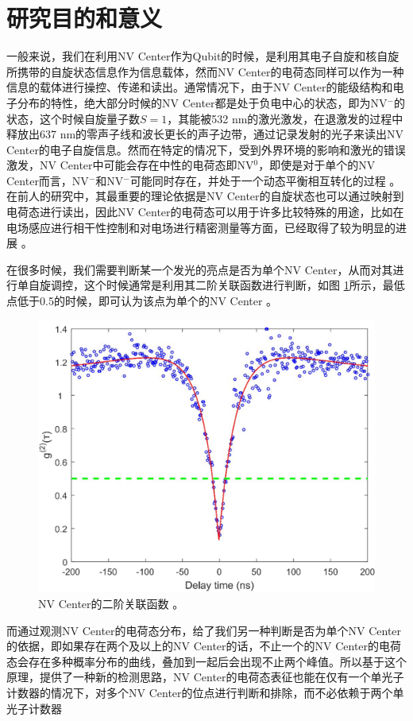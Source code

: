 \documentclass[type = bachelor, oneside]{whu-thesis}
\begin{document}
\section{研究目的和意义}

一般来说，我们在利用NV Center作为Qubit的时候，是利用其电子自旋和核自旋所携带的自旋状态信息作为信息载体，然而NV Center的电荷态同样可以作为一种信息的载体进行操控、传递和读出。通常情况下，由于NV Center的能级结构和电子分布的特性，绝大部分时候的NV Center都是处于负电中心的状态，即为NV$^-$的状态，这个时候自旋量子数$S=1$，其能被532 nm的激光激发，在退激发的过程中释放出637 nm的零声子线和波长更长的声子边带，通过记录发射的光子来读出NV Center的电子自旋信息。然而在特定的情况下，受到外界环境的影响和激光的错误激发，NV Center中可能会存在中性的电荷态即NV$^0$，即使是对于单个的NV Center而言，NV$^-$和NV$^-$可能同时存在，并处于一个动态平衡相互转化的过程 \cite{Shields2015,Hacquebard2018,Shinei2021}。在前人的研究中，其最重要的理论依据是NV Center的自旋状态也可以通过映射到电荷态进行读出，因此NV Center的电荷态可以用于许多比较特殊的用途，比如在电场感应进行相干性控制和对电场进行精密测量等方面，已经取得了较为明显的进展 \cite{Yan2022,Kurokawa2023}。

在很多时候，我们需要判断某一个发光的亮点是否为单个NV Center，从而对其进行单自旋调控，这个时候通常是利用其二阶关联函数进行判断，如图 \ref{fig: g2_function}所示，最低点低于0.5的时候，即可认为该点为单个的NV Center \cite{Sow2020,Robledo2011,Doherty2012}。
\begin{figure}
  \centering
  \includegraphics[width=0.8 \textwidth]{figures/Chapter 1/g2_function.png}
  \caption[NV Center的二阶关联函数]{NV Center的二阶关联函数 \cite{Sow2020}。}
  \label{fig: g2_function}
\end{figure}
而通过观测NV Center的电荷态分布，给了我们另一种判断是否为单个NV Center的依据，即如果存在两个及以上的NV Center的话，不止一个的NV Center的电荷态会存在多种概率分布的曲线，叠加到一起后会出现不止两个峰值。所以基于这个原理，提供了一种新的检测思路，NV Center的电荷态表征也能在仅有一个单光子计数器的情况下，对多个NV Center的位点进行判断和排除，而不必依赖于两个单光子计数器
\end{document}
